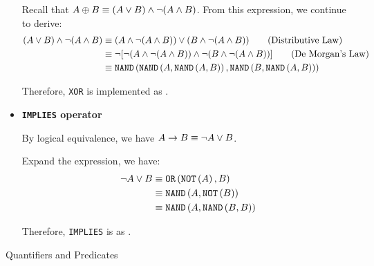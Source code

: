 \documentclass[answers]{exam}
\begin{document}
\begin{questions}
\begin{parts}
\begin{solution}
\begin{itemize}
                Recall that $A\oplus B
                \equiv (A\lor B)\land\neg(A\land B)$. From this expression, we continue to derive:
                \begin{align*}
                    (A\lor B)\land\neg(A\land B)
                    &\equiv (A\land\neg(A\land B))\lor(B\land\neg(A\land B)) \qquad\text{(Distributive Law)}\\
                    &\equiv \neg[\neg(A\land\neg(A\land B))\land\neg(B\land\neg(A\land B))] \qquad\text{(De Morgan's Law)}\\
                    &\equiv \texttt{NAND}\left(
                        \texttt{NAND}\left(A, \texttt{NAND}\left(A, B\right)\right)
                    , 
                        \texttt{NAND}\left(B, \texttt{NAND}\left(A, B\right)\right)
                    \right)
                \end{align*}

                Therefore, \texttt{XOR} is implemented as .

                \item \textbf{\texttt{IMPLIES} operator}
                
                By logical equivalence, we have $A \rightarrow B \equiv \neg A \lor B$.

                Expand the expression, we have:
                \begin{align*}
                    \neg A\lor B
                    &\equiv \texttt{OR}\left(\texttt{NOT}\left(A\right), B\right) \\
                    &\equiv \texttt{NAND}\left(A, \texttt{NOT}\left(B\right)\right) \\
                    &\equiv \texttt{NAND}\left(A, \texttt{NAND}\left(B, B\right)\right)
                \end{align*}

                Therefore, \texttt{IMPLIES} is as .
            \end{itemize}
        \end{solution}
    \end{parts}

    \question Quantifiers and Predicates

    \begin{parts}
        

\end{parts}
\end{questions}
\end{document}

